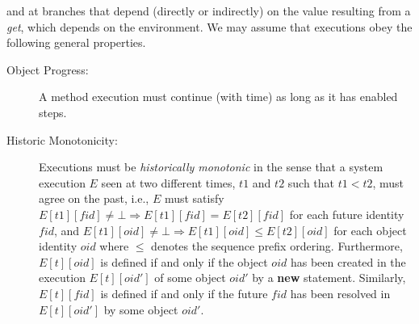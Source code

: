 and at branches that depend (directly or indirectly) on the value resulting from a  \emph{get}, which depends on the environment.
We may  assume that  executions  obey the following  general properties.
\begin{description}%
\item[Object Progress:]
A method execution must continue (with time)
as long as it has enabled steps.

\item[Historic Monotonicity:]
Executions must be \emph{historically monotonic}
in the sense that a system execution $E$
seen at two different times,  $t1$
and  $t2$ such that $t1<t2$,
must agree on the past, i.e.,  $E$ must  satisfy
$E[t1][\mathit{fid}] \not=\bot  \Rightarrow E[t1][\mathit{fid}] =E[t2][\mathit{fid}]$
 for each future identity $\mathit{fid}$,
and
$E[t1][oid] \not=\bot  \Rightarrow E[t1][oid] \leq E[t2][oid]$ 
for each object identity $oid$ where $\leq$ denotes 
the sequence prefix ordering.
Furthermore, %
 $E[t][oid]$ is defined if and only if
the object $oid$ has been  created in the  execution  $E[t][oid']$ of
some object $oid'$ by a  \textbf{new} statement. %
Similarly,  $E[t][\mathit{fid}]$ is defined
if and only if
the future  $\mathit{fid}$ has been resolved in  $E[t][oid']$ by some object  $oid'$.


\end{description}
